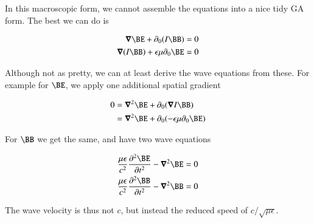 In this macroscopic form, we cannot assemble the equations into a nice tidy GA form.  The best we can do is

\begin{align}
\spacegrad \BE + \partial_0 (I\BB) &= 0 \\
\spacegrad (I \BB) + \epsilon \mu \partial_0 \BE &= 0 
\end{align}

Although not as pretty, we can at least derive the wave equations from these.  For example for $\BE$, we apply one additional
spatial gradient

\begin{align*}
0 
&= \spacegrad^2 \BE + \partial_0 (\spacegrad I \BB) \\
&= \spacegrad^2 \BE + \partial_0 ( -\epsilon \mu \partial_0 \BE ) \\
\end{align*}

For $\BB$ we get the same, and have two wave equations

\begin{align}
\frac{\mu \epsilon}{c^2} \frac{\partial^2 \BE}{\partial t^2} - \spacegrad^2 \BE &= 0 \\
\frac{\mu \epsilon}{c^2} \frac{\partial^2 \BB}{\partial t^2} - \spacegrad^2 \BB &= 0
\end{align}

The wave velocity is thus not $c$, but instead the reduced speed of $c/{\sqrt{\mu\epsilon}}$.

%
%

%
